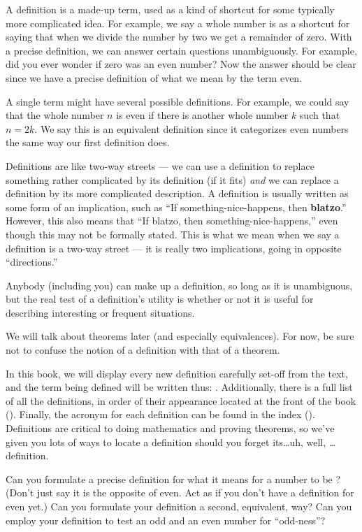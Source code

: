 A definition is a made-up term, used as a kind of shortcut for some typically more complicated idea.  For example, we say a whole number is  as a shortcut for saying that when we divide the number by two we get a remainder of zero.  With a precise definition, we can answer certain questions unambiguously.  For example, did you ever wonder if zero was an even number?  Now the answer should be clear since we have a precise definition of what we mean by the term even.\par
%
A single term might have several possible definitions.  For example, we could say that the whole number $n$ is even if there is another whole number $k$ such that $n=2k$.  We say this is an equivalent definition since it categorizes even numbers the same way our first definition does.\par
%
Definitions are like two-way streets --- we can use a definition to replace something rather complicated by its definition (if it fits) {\em and} we can replace a definition by its more complicated description.  A definition is usually written as some form of an implication, such as ``If something-nice-happens, then {\bf blatzo}.''  However, this also means that ``If blatzo, then something-nice-happens,'' even though this may not be formally stated.  This is what we mean when we say a definition is a two-way street --- it is really two implications, going in opposite ``directions.''\par
%
Anybody (including you) can make up a definition, so long as it is unambiguous, but the real test of a definition's utility is whether or not it is useful for describing interesting or frequent situations.\par
%
We will talk about theorems later (and especially equivalences).  For now, be sure not to confuse the notion of a definition with that of a theorem.\par
%
In this book, we will display every new definition carefully set-off from the text, and the term being defined will be written thus: .  Additionally, there is a full list of all the definitions, in order of their appearance located at the front of the book ().  Finally, the acronym for each definition can be found in the index ().  Definitions are critical to doing mathematics and proving theorems, so we've given you lots of ways to locate a definition should you forget its\dots uh, well, \dots definition.\par
%
Can you formulate a precise definition for what it means for a number to be ?  (Don't just say it is the opposite of even.  Act as if you don't have a definition for even yet.)  Can you formulate your definition a second, equivalent, way?  Can you employ your definition to test an odd and an even number for ``odd-ness''?
